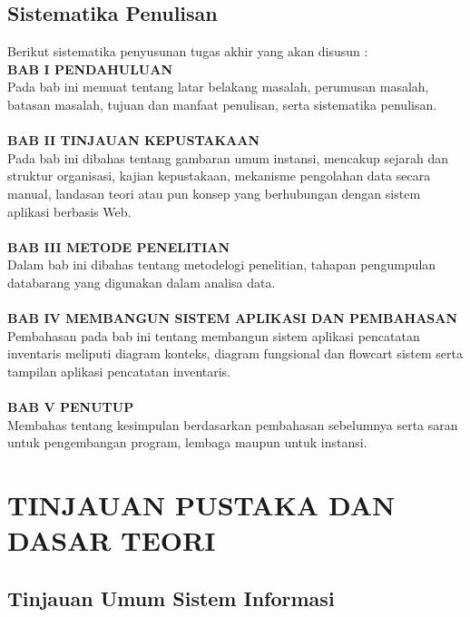 \documentclass{jtetiproposalskripsi}
\begin{document}
\section{Sistematika Penulisan}
Berikut sistematika penyusunan tugas akhir yang akan disusun :
\\
\textbf{BAB I     PENDAHULUAN}
\\
Pada bab ini memuat tentang latar belakang masalah, perumusan masalah, batasan masalah, tujuan dan manfaat penulisan, serta sistematika penulisan.
\\
\\
\textbf{BAB II    TINJAUAN KEPUSTAKAAN}
\\
Pada bab ini dibahas tentang gambaran umum instansi, mencakup sejarah dan struktur organisasi, kajian kepustakaan, mekanisme pengolahan data secara manual, landasan teori atau pun konsep yang berhubungan dengan sistem aplikasi berbasis Web.
\\
\\
\textbf{BAB III  METODE PENELITIAN}
\\
Dalam bab ini dibahas tentang metodelogi penelitian, tahapan pengumpulan databarang yang digunakan dalam analisa data.
\\
\\
\textbf{BAB IV  MEMBANGUN SISTEM APLIKASI DAN PEMBAHASAN}
\\
Pembahasan  pada  bab  ini  tentang  membangun  sistem  aplikasi  pencatatan inventaris meliputi diagram konteks, diagram fungsional dan flowcart sistem serta tampilan aplikasi pencatatan inventaris.
\\
\\
\textbf{BAB V    PENUTUP}
\\
Membahas tentang kesimpulan berdasarkan  pembahasan sebelumnya serta saran untuk pengembangan program, lembaga maupun untuk instansi. 



\chapter{TINJAUAN PUSTAKA DAN DASAR TEORI}                

\section{Tinjauan Umum Sistem Informasi}
\end{document}
